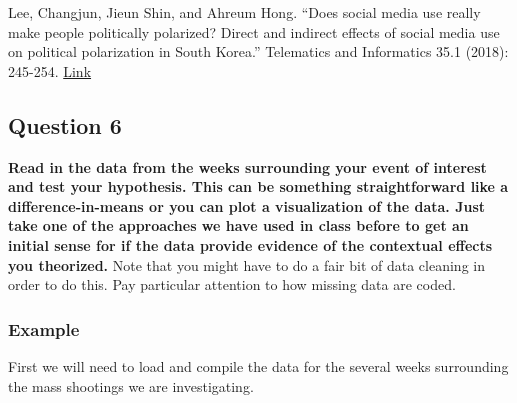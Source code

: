 \documentclass[
]{article}
\begin{document}
Lee, Changjun, Jieun Shin, and Ahreum Hong. ``Does social media use
really make people politically polarized? Direct and indirect effects of
social media use on political polarization in South Korea.'' Telematics
and Informatics 35.1 (2018): 245-254.
\href{https://www.sciencedirect.com/science/article/abs/pii/S0736585317305208}{Link}

\hypertarget{question-6}{%
\subsection{Question 6}\label{question-6}}

\textbf{Read in the data from the weeks surrounding your event of
interest and test your hypothesis. This can be something straightforward
like a difference-in-means or you can plot a visualization of the data.
Just take one of the approaches we have used in class before to get an
initial sense for if the data provide evidence of the contextual effects
you theorized.} Note that you might have to do a fair bit of data
cleaning in order to do this. Pay particular attention to how missing
data are coded.

\hypertarget{example}{%
\subsubsection{Example}\label{example}}

First we will need to load and compile the data for the several weeks
surrounding the mass shootings we are investigating.
\end{document}
